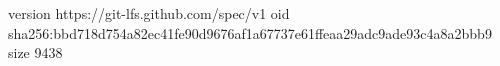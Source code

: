 version https://git-lfs.github.com/spec/v1
oid sha256:bbd718d754a82ec41fe90d9676af1a67737e61ffeaa29adc9ade93c4a8a2bbb9
size 9438
